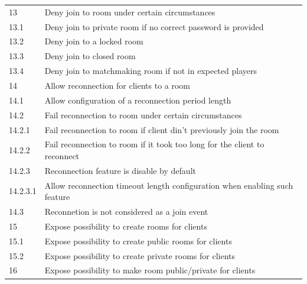 \begin{center}
\begin{longtable}{|l|l|}
13        & Deny join to room under certain circumstances \\
13.1      & Deny join to private room if no correct password is provided \\
13.2      & Deny join to a locked room \\
13.3      & Deny join to closed room \\
13.4      & Deny join to matchmaking room if not in expected players \\
14        & Allow reconnection for clients to a room \\
14.1      & Allow configuration of a reconnection period length \\
14.2      & Fail reconnection to room under certain circumstances \\
14.2.1    & Fail reconnection to room if client din't previously join the room \\
14.2.2    & Fail reconnection to room if it took too long for the client to reconnect \\
14.2.3    & Reconnection feature is disable by default \\
14.2.3.1  & Allow reconnection timeout length configuration when enabling such feature \\
14.3      & Reconnetion is not considered as a join event \\
15        & Expose possibility to create rooms for clients \\
15.1      & Expose possibility to create public rooms for clients \\
15.2      & Expose possibility to create private rooms for clients \\
16        & Expose possibility to make room public/private for clients \\
\hline

  \end{longtable}
\end{center}

